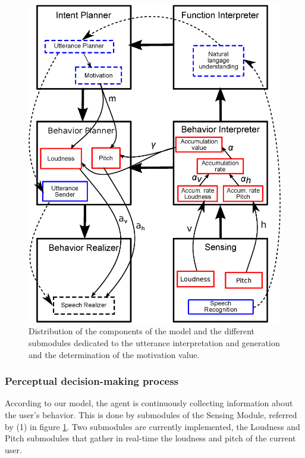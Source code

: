 \begin{figure}
  \centering
  \includegraphics[width=\linewidth]{figure/impl_equ_dial.eps}
  \caption{Distribution of the components of the model and the different submodules dedicated to the utterance interpretation and generation and the determination of the motivation value.}
  \label{impl_modules}
\end{figure}

\subsubsection{Perceptual decision-making process}

According to our model, the agent is continuously collecting information about the user's behavior. This is done by submodules of the Sensing Module, referred by (1) in figure \ref{impl_modules}. Two submodules are currently implemented, the Loudness and Pitch submodules that gather in real-time the loudness and pitch of the current user. 

